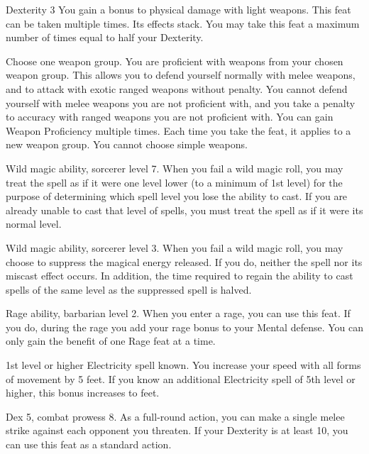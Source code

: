 \featpres Dexterity 3
\featben You gain a  bonus to physical damage with light weapons.
 This feat can be taken multiple times. Its effects stack.
You may take this feat a maximum number of times equal to half your Dexterity.

Choose one weapon group.
\featben You are proficient with weapons from your chosen weapon group.
This allows you to defend yourself normally with melee weapons, and to attack with exotic ranged weapons without penalty.
You cannot defend yourself with melee weapons you are not proficient with, and you take a  penalty to accuracy with ranged weapons you are not proficient with.
You can gain Weapon Proficiency multiple times.
Each time you take the feat, it applies to a new weapon group.
You cannot choose simple weapons.

\featpre Wild magic ability, sorcerer level 7.
\featben When you fail a wild magic roll, you may treat the spell as if it were one level lower (to a minimum of 1st level) for the purpose of determining which spell level you lose the ability to cast.
If you are already unable to cast that level of spells, you must treat the spell as if it were its normal level.

\featpre Wild magic ability, sorcerer level 3.
\featben When you fail a wild magic roll, you may choose to suppress the magical energy released.
If you do, neither the spell nor its miscast effect occurs.
In addition, the time required to regain the ability to cast spells of the same level as the suppressed spell is halved.

\featpre Rage ability, barbarian level 2.
\featben When you enter a rage, you can use this feat. If you do, during the rage you add your rage bonus to your Mental defense.
 You can only gain the benefit of one Rage feat at a time.

\featpre 1st level or higher Electricity spell known.
\featben You increase your speed with all forms of movement by 5 feet.
If you know an additional Electricity spell of 5th level or higher, this bonus increases to  feet.

\featpres Dex 5, combat prowess 8.
\featben As a full-round action, you can make a single melee strike against each opponent you threaten.
If your Dexterity is at least 10, you can use this feat as a standard action.

